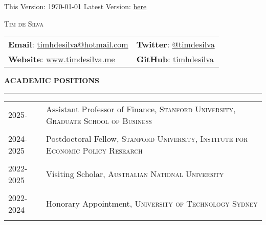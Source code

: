 \documentclass[a4paper, 10pt]{article}
\newcommand{\cvsec}[1]
{
	\needspace{2\baselineskip}
	\noindent \textbf{#1}
	
	\vspace{2pt}
	
	\hrule
	
	\bigskip
}
\newcommand{\cvitem}[2]{#1 & #2 \\ & \\}
\newenvironment{cvchrono}[1]
{
	\cvsec{#1}
	\begin{tabu} to \linewidth {X[1,l]X[6,l]} 
}
{
	\end{tabu}
}
\begin{document}
\begin{flushright}
	This Version: \today{}
	\vskip 0.01cm 
	Latest Version: \href{https://www.timdesilva.me/files/cv.pdf}{here}
\end{flushright}

\bigskip

\begin{center}
	\huge \textsc{Tim de Silva}
\end{center}

\bigskip \bigskip

\begin{tabu} to \linewidth {X[l]X[r]}
	 \textbf{Email}: \href{mailto:timhdesilva@hotmail.com}{timhdesilva@hotmail.com} & \textbf{Twitter}: \href{https://twitter.com/timdesilva}{@timdesilva} \\
	\textbf{Website}: \href{http://www.timdesilva.me}{www.timdesilva.me} & \textbf{GitHub}: \href{https://github.com/timhdesilva}{timhdesilva} \\
\end{tabu}

\bigskip \bigskip

\begin{cvchrono}{ACADEMIC POSITIONS}
	\cvitem{2025-}{Assistant Professor of Finance, \textsc{Stanford University, Graduate School of Business}
		}
	\cvitem{2024-2025}{Postdoctoral Fellow, \textsc{Stanford University, Institute for Economic Policy Research}
		}
	\cvitem{2022-2025}{Visiting Scholar, \textsc{Australian National University}}
	\cvitem{2022-2024}{Honorary Appointment, \textsc{University of Technology Sydney}}
\end{cvchrono}
\end{document}

